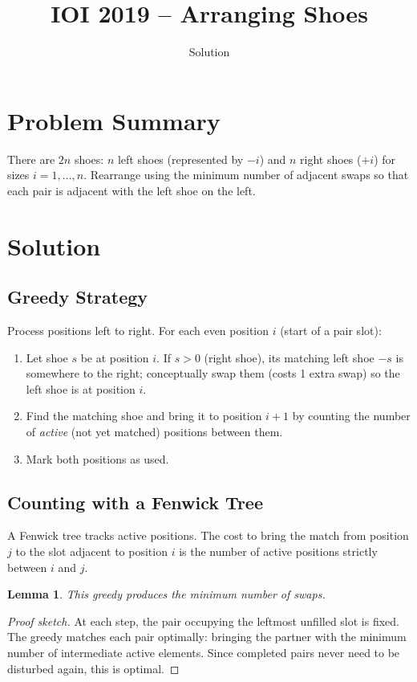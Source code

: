\documentclass[11pt,a4paper]{article}
\title{IOI 2019 -- Arranging Shoes}
\author{Solution}
\date{}
\newtheorem{lemma}{Lemma}
\begin{document}
\maketitle

\section{Problem Summary}
There are $2n$ shoes: $n$ left shoes (represented by $-i$) and $n$ right shoes ($+i$) for sizes $i = 1, \ldots, n$. Rearrange using the minimum number of adjacent swaps so that each pair is adjacent with the left shoe on the left.

\section{Solution}

\subsection{Greedy Strategy}
Process positions left to right. For each even position $i$ (start of a pair slot):
\begin{enumerate}
  \item Let shoe $s$ be at position $i$. If $s > 0$ (right shoe), its matching left shoe $-s$ is somewhere to the right; conceptually swap them (costs 1 extra swap) so the left shoe is at position $i$.
  \item Find the matching shoe and bring it to position $i+1$ by counting the number of \emph{active} (not yet matched) positions between them.
  \item Mark both positions as used.
\end{enumerate}

\subsection{Counting with a Fenwick Tree}
A Fenwick tree tracks active positions. The cost to bring the match from position $j$ to the slot adjacent to position $i$ is the number of active positions strictly between $i$ and $j$.

\begin{lemma}
This greedy produces the minimum number of swaps.
\end{lemma}
\begin{proof}[Proof sketch]
At each step, the pair occupying the leftmost unfilled slot is fixed. The greedy matches each pair optimally: bringing the partner with the minimum number of intermediate active elements. Since completed pairs never need to be disturbed again, this is optimal.
\end{proof}
\end{document}
